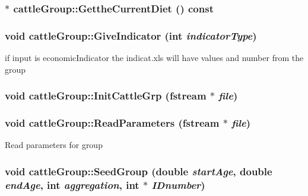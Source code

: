 \label{classcattle_group_a8c1f3939bebff589498dde95743927a6}
\hypertarget{classcattle_group_a002c57c86825dcb46870c50ce97f9d79}{
\subsubsection[{GettheCurrentDiet}]{$\ast$ cattleGroup::GettheCurrentDiet () const}}
\label{classcattle_group_a002c57c86825dcb46870c50ce97f9d79}
\hypertarget{classcattle_group_a302e7ade98ec5f4c60c32f4123d14b09}{
\subsubsection[{GiveIndicator}]{\setlength{\rightskip}{0pt plus 5cm}void cattleGroup::GiveIndicator (int {\em indicatorType})}}
\label{classcattle_group_a302e7ade98ec5f4c60c32f4123d14b09}
if input is economicIndicator the indicat.xls will have values and number from the group \hypertarget{classcattle_group_a9f984d5505fca52ed79f950bc9c01a78}{
\subsubsection[{InitCattleGrp}]{\setlength{\rightskip}{0pt plus 5cm}void cattleGroup::InitCattleGrp (fstream $\ast$ {\em file})}}
\label{classcattle_group_a9f984d5505fca52ed79f950bc9c01a78}
\hypertarget{classcattle_group_aa82f6f64e7b90b317c8178f11199e0f7}{
\subsubsection[{ReadParameters}]{\setlength{\rightskip}{0pt plus 5cm}void cattleGroup::ReadParameters (fstream $\ast$ {\em file})}}
\label{classcattle_group_aa82f6f64e7b90b317c8178f11199e0f7}
Read parameters for group \hypertarget{classcattle_group_a0f7c6c00ebef0008d2206dde4b2430db}{
\subsubsection[{SeedGroup}]{\setlength{\rightskip}{0pt plus 5cm}void cattleGroup::SeedGroup (double {\em startAge}, \/  double {\em endAge}, \/  int {\em aggregation}, \/  int $\ast$ {\em IDnumber})}}
